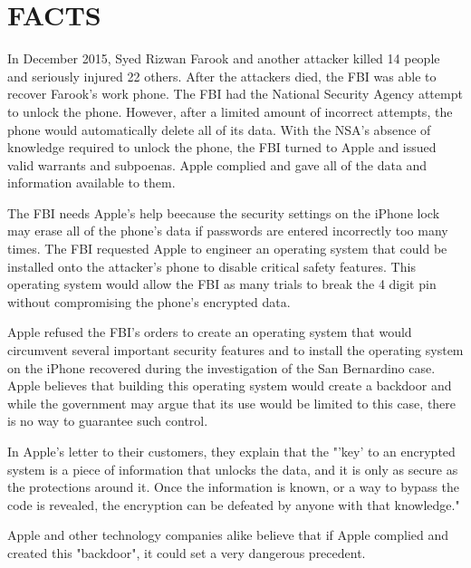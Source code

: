 
\section{FACTS}
In December 2015, Syed Rizwan Farook and another attacker killed 14 people and seriously injured 22 others. After the attackers died, the FBI was able to recover Farook's work phone. The FBI had the National Security Agency attempt to unlock the phone. However, after a limited amount of incorrect attempts, the phone would automatically delete all of its data. With the NSA's absence of knowledge required to unlock the phone, the FBI turned to Apple and issued valid warrants and subpoenas. Apple complied and gave all of the data and information available to them.\cite{apple-letter}\par

The FBI needs Apple's help beecause the security settings on the iPhone lock may erase all of the phone's data if passwords are entered incorrectly too many times. The FBI requested Apple to engineer an operating system that could be installed onto the attacker's phone to disable critical safety features. This operating system would allow the FBI as many trials to break the 4 digit pin without compromising the phone's encrypted data. \cite{aljazeera}\par

Apple refused the FBI's orders to create an operating system that would circumvent several important security features and to install the operating system on the iPhone recovered during the investigation of the San Bernardino case. Apple believes that building this operating system would create a backdoor and while the government may argue that its use would be limited to this case, there is no way to guarantee such control. \cite{apple-letter}\par

In Apple's letter to their customers, they explain that the "'key' to an encrypted system is a piece of information that unlocks the data, and it is only as secure as the protections around it. Once the information is known, or a way to bypass the code is revealed, the encryption can be defeated by anyone with that knowledge." \cite{apple-letter}\par

Apple and other technology companies alike believe that if Apple complied and created this "backdoor", it could set a very dangerous precedent. 
\vspace{0.4cm}






